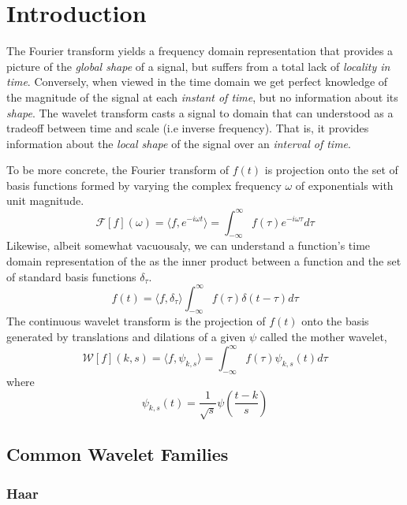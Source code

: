 \documentclass[12pt]{article}
\newcommand{\Fourier}[1]{\mathcal{F}[#1]}
\newcommand{\Wavelet}[1]{\mathcal{W}[#1]}
\newcommand{\innerprod}[2]{\langle #1, #2 \rangle}
\begin{document}
\section{Introduction}

The Fourier transform yields a frequency domain representation that provides a picture of the \textit{global shape} of a signal, but suffers from a total lack of \textit{locality in time}.
Conversely, when viewed in the time domain we get perfect knowledge of the magnitude of the signal at each \textit{instant of time}, but no information about its \textit{shape}.
The wavelet transform casts a signal to domain that can understood as a tradeoff between time and scale (i.e inverse frequency).  
That is, it provides information about the \textit{local shape} of the signal over an \textit{interval of time}.

To be more concrete, the Fourier transform of $f(t)$ is projection onto the set of basis functions formed by varying the complex frequency $\omega$ of exponentials with unit magnitude.
\begin{equation}
    \Fourier{f}(\omega) = \innerprod{f}{e^{-i\omega t}} = \int_{-\infty}^{\infty} f(\tau) e^{-i\omega \tau} d\tau
\end{equation}
Likewise, albeit somewhat vacuousaly, we can understand a function's time domain representation of the as the inner product between a function and the set of standard basis functions $\delta_\tau$.
\begin{equation}
    f(t) = \innerprod{f}{\delta_\tau} \int_{-\infty}^{\infty} f(\tau) \delta(t - \tau) d\tau
\end{equation}
The continuous wavelet transform is the projection of $f(t)$ onto the basis generated by translations and dilations of a given $\psi$ called the mother wavelet,
\begin{equation}
    \Wavelet{f}(k, s) = \innerprod{f}{\psi_{k, s}} = \int_{-\infty}^{\infty} f(\tau) \psi_{k, s}(t) d\tau
\end{equation}
where
\begin{equation}
    \psi_{k, s}(t) = \frac{1}{\sqrt{s}} \psi(\frac{t - k}{s})
\end{equation}

\subsection{Common Wavelet Families}

\subsubsection{Haar}
\end{document}
